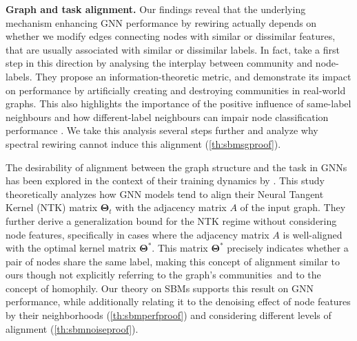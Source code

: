 \textbf{Graph and task alignment.}
Our findings reveal that the underlying mechanism enhancing GNN performance by rewiring actually depends on whether we modify edges connecting nodes with similar or dissimilar features, that are usually associated with similar or dissimilar labels. 
In fact, \citet{interplaycommunity} take a first step in this direction by analysing the interplay between community and node-labels. 
They propose an information-theoretic metric, and demonstrate its impact on performance by artificially creating and destroying communities in real-world graphs. This also highlights the importance of the positive influence of same-label neighbours and how different-label neighbours can impair node classification performance \citep{labelawaregcn}.
We take this analysis several steps further and analyze why spectral rewiring cannot induce this alignment (\autoref{th:sbmsgproof}).  

The desirability of alignment between the graph structure and the task in GNNs has been explored in the context of their training dynamics by \citet{yang2024how}. This study theoretically analyzes how GNN models tend to align their Neural Tangent Kernel (NTK) matrix $\mathbf{\Theta}_t$ with the adjacency matrix $A$ of the input graph. 
They further derive a generalization bound for the NTK regime without considering node features, specifically in cases where the adjacency matrix $A$ is well-aligned with the optimal kernel matrix $\mathbf{\Theta}^*$. 
This matrix $\mathbf{\Theta}^*$ precisely indicates whether a pair of nodes share the same label, making this concept of alignment similar to ours \textemdash though not explicitly referring to the graph's communities\textemdash~and to the concept of homophily. 
Our theory on SBMs supports this result on GNN performance, while additionally relating it to the denoising effect of node features by their neighborhoods (\autoref{th:sbmperfproof}) and considering different levels of alignment (\autoref{th:sbmnoiseproof}).